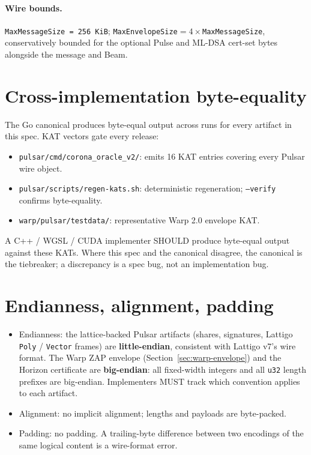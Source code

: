 \documentclass[11pt,a4paper]{article}
\begin{document}
\paragraph{Wire bounds.} \texttt{MaxMessageSize = 256\,KiB}; \texttt{MaxEnvelopeSize}${} = 4 \times {}$\texttt{MaxMessageSize}, conservatively bounded for the optional Pulse and ML-DSA cert-set bytes alongside the message and Beam.

\section{Cross-implementation byte-equality}

The Go canonical produces byte-equal output across runs for every artifact in this spec. KAT vectors gate every release:

\begin{itemize}[leftmargin=2em,nosep]
  \item \texttt{pulsar/cmd/corona\_oracle\_v2/}: emits 16 KAT entries covering every Pulsar wire object.
  \item \texttt{pulsar/scripts/regen-kats.sh}: deterministic regeneration; \texttt{--verify} confirms byte-equality.
  \item \texttt{warp/pulsar/testdata/}: representative Warp 2.0 envelope KAT.
\end{itemize}

A C++ / WGSL / CUDA implementer SHOULD produce byte-equal output against these KATs. Where this spec and the canonical disagree, the canonical is the tiebreaker; a discrepancy is a spec bug, not an implementation bug.

\section{Endianness, alignment, padding}

\begin{itemize}[leftmargin=2em,nosep]
  \item Endianness: the lattice-backed Pulsar artifacts (shares, signatures, Lattigo \texttt{Poly} / \texttt{Vector} frames) are \textbf{little-endian}, consistent with Lattigo v7's wire format. The Warp ZAP envelope (Section~\ref{sec:warp-envelope}) and the Horizon certificate are \textbf{big-endian}: all fixed-width integers and all \texttt{u32} length prefixes are big-endian. Implementers MUST track which convention applies to each artifact.
  \item Alignment: no implicit alignment; lengths and payloads are byte-packed.
  \item Padding: no padding. A trailing-byte difference between two encodings of the same logical content is a wire-format error.
\end{itemize}
\end{document}
